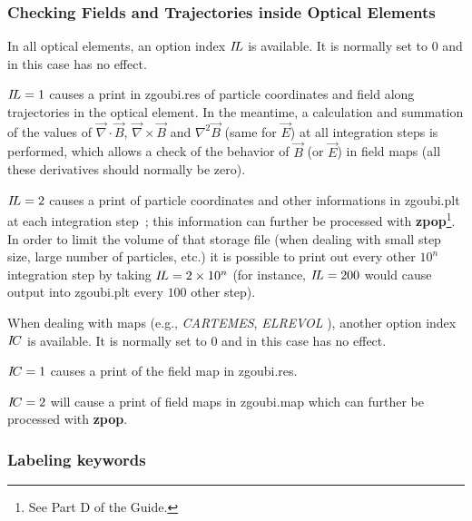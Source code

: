 \subsubsection{Checking Fields and Trajectories inside Optical Elements}  \label{sec4.6.1}

In all optical elements, an option index $ I\!L $ is available.  It
is normally set to 0 and in this case has no effect.

\noindent $ I\!L=1 $ causes a print  in zgoubi.res  of particle 
coordinates and field
along trajectories in the optical element.  In the meantime, a calculation and summation of
the values of $ \vec  \nabla \cdot\vec  B$, 
 $ \vec  \nabla \times\vec  B $ and $ \nabla^2\vec  B $ (same for $\vec E$) at all 
integration steps is performed, which allows a check of the behavior of 
$ \vec  B $ (or $ \vec  E $) in field maps (all these derivatives should normally be zero).

\noindent $ I\!L=2 $ causes a print   of particle coordinates and other 
informations in zgoubi.plt at each integration step~; this information 
 can further be processed with 
\textbf{zpop}\footnote{See Part D of the Guide.}. In order to limit the volume of 
that storage file (when dealing with small step size, large number of particles, etc.) it is possible 
to print out  every other $10^n$ integration step by taking $ I\!L=2 \times 10^n $ (for instance, 
 $ I\!L=200 $ would cause output into zgoubi.plt every $100$ other step). 
\bigskip

\noindent When dealing with maps (e.g., \textsl{CARTEMES}, \textsl{ELREVOL
}), another option index $ I\!C $ is available.
  It is normally set to 0 and in this case has no effect.
 
\noindent $ I\!C=1 $ causes a print of the field map in zgoubi.res. 

\noindent $ I\!C=2 $ will cause a print   of field maps in zgoubi.map 
which can further be processed with \textbf{zpop}. 

\newpage

 \subsubsection{Labeling keywords}\label{sec4.6.8}


